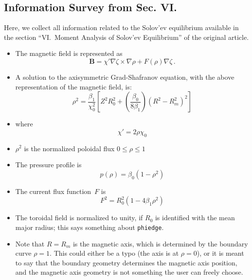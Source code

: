 \subsection{Information Survey from Sec. VI.}
Here, we collect all information
related to the Solov'ev equilibrium
available in the section ``VI.~Moment Analysis of Solov'ev Equilibrium''
of the original article.

\begin{itemize}

\item
The magnetic field is represented as
\begin{equation}
 \mathbf{B} = \chi' \nabla \zeta \times \nabla \rho + F(\rho) \nabla \zeta \, .
\end{equation}

\item
A solution to the axisymmetric Grad-Shafranov equation,
with the above representation of the magnetic field, is:
\begin{equation}
 \rho^2 = \frac{\beta_1}{\chi_0^2}
 \left[
   Z^2 R_0^2 + \left( \frac{\beta_0}{8 \beta_1} \right) \left( R^2 - R_m^2 \right)^2
 \right]
\end{equation}

\item
where
\begin{equation}
 \chi' = 2 \rho \chi_0 \label{eqn:chip}
\end{equation}

\item
$\rho^2$ is the normalized poloidal flux $0 \leq \rho \leq 1$

\item
The pressure profile is
\begin{equation}
 p(\rho) = \beta_0 \left( 1 - \rho^2 \right)
\end{equation}

\item
The current flux function~$F$ is
\begin{equation}
 F^2 = R_0^2 \left( 1 - 4 \beta_1 \rho^2 \right)
\end{equation}

\item
The toroidal field is normalized to unity,
if $R_0$ is identified with the mean major radius;
this says something about \texttt{phiedge}.

\item
Note that $R = R_m$ is the magnetic axis,
which is determined by the boundary curve $\rho = 1$.
This could either be a typo (the axis is at $\rho = 0$),
or it is meant to say that the boundary geometry determines the magnetic axis position,
and the magnetic axis geometry is not something the user can freely choose.


\end{itemize}
